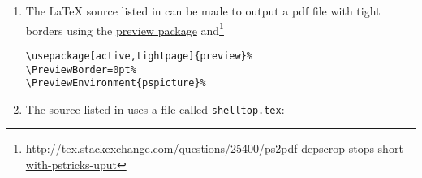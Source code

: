 \begin{enumerate}
  \item \label{item:src_Nriesz_tex} 
        The {\LaTeX} source listed in  can be made to output a pdf file
        with tight borders using the \href{http://www.ctan.org/pkg/preview}{preview package} and\footnote{
\url{http://tex.stackexchange.com/questions/25400/ps2pdf-depscrop-stops-short-with-pstricks-uput}}
\begin{lstlisting}
\usepackage[active,tightpage]{preview}%
\PreviewBorder=0pt%
\PreviewEnvironment{pspicture}%
\end{lstlisting}



  \item \label{item:src_Nriesz_shelltop} 
        The source listed in  uses a file called 
        \lstinline{shelltop.tex}:



\end{enumerate}